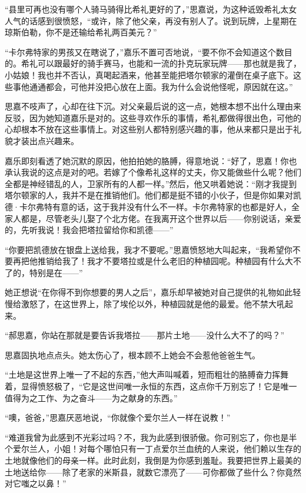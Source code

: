 \par “县里可再也没有哪个人骑马骑得比希礼更好的了，”思嘉说，为这种诋毁希礼太女人气的话感到很愤怒，“或许，除了他父亲，再没有别人了。说到玩牌，上星期在琼斯伯勒，你不是还输给希礼两百美元？”
\par “卡尔弗特家的男孩又在瞎说了，”嘉乐不置可否地说，“要不你不会知道这个数目的。希礼可以跟最好的骑手赛马，也能和一流的扑克玩家玩牌——那也就是我了，小姑娘！我也并不否认，真喝起酒来，他甚至能把塔尔顿家的灌倒在桌子底下。这些事他通通都会，可他并没把心放在上面。我为什么会说他怪呢，原因就在这。”
\par 思嘉不吱声了，心却在往下沉。对父亲最后说的这一点，她根本想不出什么理由来反驳，因为她知道嘉乐是对的。这些寻欢作乐的事情，希礼都做得很出色，可他的心却根本不放在这些事情上。对这些别人都特别感兴趣的事，他从来都只是出于礼貌才装出点兴趣来。
\par 嘉乐即刻看透了她沉默的原因，他拍拍她的胳膊，得意地说：“好了，思嘉！你也承认我说的这点是对的吧。若嫁了个像希礼这样的丈夫，你又能做些什么呢？他们全都是神经错乱的人，卫家所有的人都一样。”然后，他又哄着她说：“刚才我提到塔尔顿家的人，我并不是在推销他们。他们都是挺不错的小伙子，但是你如果对凯德·卡尔弗特有意的话，这于我并没有什么不一样。卡尔弗特家的也都是好人，全家人都是，尽管老头儿娶了个北方佬。在我离开这个世界以后——你别说话，亲爱的，先听我说！我会把塔拉留给你和凯德——”
\par “你要把凯德放在银盘上送给我，我才不要呢。”思嘉愤怒地大叫起来，“我希望你不要再把他推销给我了！我才不要塔拉或是什么老旧的种植园呢。种植园有什么大不了的，特别是在——”
\par 她正想说“在你得不到你想要的男人之后”，嘉乐却早被她对自己提供的礼物如此轻慢给激怒了，在这世界上，除了埃伦以外，种植园就是他的最爱。他不禁大吼起来。
\par “郝思嘉，你站在那就是要告诉我塔拉——那片土地——没什么大不了的吗？”
\par 思嘉固执地点点头。她太伤心了，根本顾不上她会不会惹他爸爸生气。
\par “土地是这世界上唯一了不起的东西，”他大声叫喊着，短而粗壮的胳膊奋力挥舞着，显得愤怒极了，“它是这世间唯一永恒的东西，这点你千万别忘了！它是唯一值得为之工作、为之奋斗——为之献身的东西。”
\par “噢，爸爸，”思嘉厌恶地说，“你就像个爱尔兰人一样在说教！”
\par “难道我曾为此感到不光彩过吗？不，我为此感到很骄傲。你可别忘了，你也是半个爱尔兰人，小姐！对每个哪怕只有一丁点爱尔兰血统的人来说，他们赖以生存的土地就像他们的母亲一样。此时此刻，我倒是为你感到羞耻。我要把世界上最美的土地送给你——除了老家的米斯县，就数它漂亮了——可你都做了些什么？你竟然对它嗤之以鼻！”
